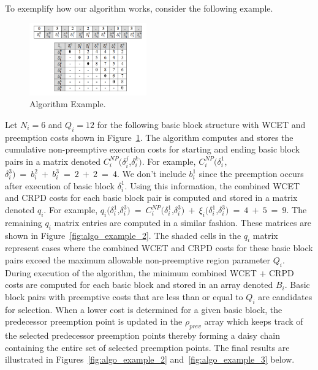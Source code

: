 To exemplify how our algorithm works, consider the following example.
\begin{figure}[h!]
\vspace{-5pt}
\begin{center}
\includegraphics[width=0.45\textwidth]{algo_example.png}
\caption{Algorithm Example.}
\label{fig:algo_example}
\end{center}
\vspace{-10pt}
\end{figure}
Let $N_i=6$ and $Q_i=12$ for the following basic block structure with WCET and preemption costs shown in Figure~\ref{fig:algo_example}.  The algorithm computes and stores the cumulative non-preemptive execution costs for starting and ending basic block pairs in a matrix denoted $C_{i}^{NP}(\delta_{i}^{j}$,$\delta_{i}^{k})$. For example, $C_{i}^{NP}(\delta_{i}^{1}$,$\delta_{i}^{3})\ =\ b_{i}^{2}\ +\ b_{i}^{3}\ =\ 2\ +\ 2\ =\ 4$.  We don't include $b_{i}^{1}$ since the preemption occurs after execution of basic block $\delta_{i}^{1}$.  Using this information, the combined WCET and CRPD costs for each basic block pair is computed and stored in a matrix denoted $q_{i}$. For example, $q_{i}(\delta_{i}^{1}$,$\delta_{i}^{3})\ =\ C_{i}^{NP}(\delta_{i}^{1}$,$\delta_{i}^{3})\ +\ \xi_{i}(\delta_{i}^{1}$,$\delta_{i}^{3})\ =\ 4\ +\ 5\ =\ 9$.  The remaining $q_{i}$ matrix entries are computed in a similar fashion.  These matrices are shown in Figure~\ref{fig:algo_example_2}.  The shaded cells in the $q_{i}$ matrix represent cases where the combined WCET and CRPD costs for these basic block pairs exceed the maximum allowable non-preemptive region parameter $Q_i$.  During execution of the algorithm, the minimum combined WCET + CRPD costs are computed for each basic block and stored in an array denoted $B_{i}$.  Basic block pairs with preemptive costs that are less than or equal to $Q_i$ are candidates for selection.  When a lower cost is determined for a given basic block, the predecessor preemption point is updated in the $\rho_{prev}$ array which keeps track of the selected predecessor preemption points thereby forming a daisy chain containing the entire set of selected preemption points.  The final results are illustrated in Figures~\ref{fig:algo_example_2} and~\ref{fig:algo_example_3} below.
